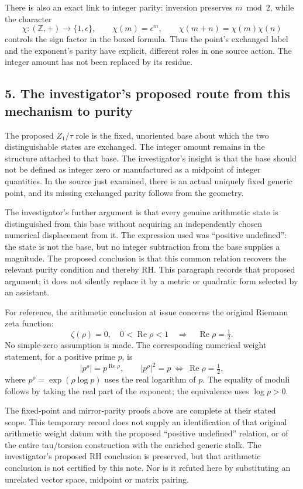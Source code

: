 \documentclass[
]{article}
\begin{document}
There is also an exact link to integer parity: inversion preserves
\(m\bmod2\), while the character \[
\chi:(\mathbb Z,+)\longrightarrow\{1,\epsilon\},
\qquad\chi(m)=\epsilon^m,
\qquad\chi(m+n)=\chi(m)\chi(n)
\] controls the sign factor in the boxed formula. Thus the point's
exchanged label and the exponent's parity have explicit, different roles
in one source action. The integer amount has not been replaced by its
residue.

\subsection{5. The investigator's proposed route from this mechanism to
purity}\label{the-investigators-proposed-route-from-this-mechanism-to-purity}

The proposed \(Z_1/\tau\) role is the fixed, unoriented base about which
the two distinguishable states are exchanged. The integer amount remains
in the structure attached to that base. The investigator's insight is
that the base should not be defined as integer zero or manufactured as a
midpoint of integer quantities. In the source just examined, there is an
actual uniquely fixed generic point, and its missing exchanged parity
follows from the geometry.

The investigator's further argument is that every genuine arithmetic
state is distinguished from this base without acquiring an independently
chosen numerical displacement from it. The expression used was
``positive undefined'': the state is not the base, but no integer
subtraction from the base supplies a magnitude. The proposed conclusion
is that this common relation recovers the relevant purity condition and
thereby RH. This paragraph records that proposed argument; it does not
silently replace it by a metric or quadratic form selected by an
assistant.

For reference, the arithmetic conclusion at issue concerns the original
Riemann zeta function: \[
\zeta(\rho)=0,\quad0<\operatorname{Re}\rho<1
\quad\Longrightarrow\quad\operatorname{Re}\rho=\tfrac12.
\] No simple-zero assumption is made. The corresponding numerical weight
statement, for a positive prime \(p\), is \[
|p^\rho|=p^{\operatorname{Re}\rho},\qquad
|p^\rho|^2=p\ \Longleftrightarrow\ \operatorname{Re}\rho=\tfrac12,
\] where \(p^\rho=\exp(\rho\log p)\) uses the real logarithm of \(p\).
The equality of moduli follows by taking the real part of the exponent;
the equivalence uses \(\log p>0\).

The fixed-point and mirror-parity proofs above are complete at their
stated scope. This temporary record does not supply an identification of
that original arithmetic weight datum with the proposed ``positive
undefined'' relation, or of the entire tau/torsion construction with the
enriched generic stalk. The investigator's proposed RH conclusion is
preserved, but that arithmetic conclusion is not certified by this note.
Nor is it refuted here by substituting an unrelated vector space,
midpoint or matrix pairing.
\end{document}
